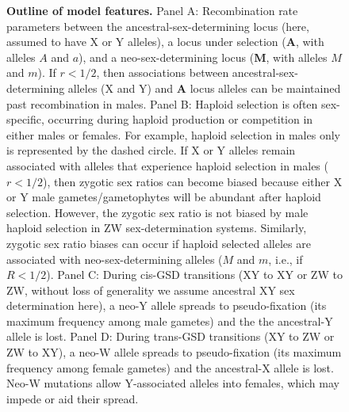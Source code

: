 \documentclass[10pt,letterpaper]{article}
\begin{document}
\begin{figure}[!h]
\caption{
{\bf Outline of model features.}
Panel A: Recombination rate parameters between the ancestral-sex-determining locus (here, assumed to have X or Y alleles), a locus under selection (\textbf{A}, with alleles $A$ and $a$), and a neo-sex-determining locus (\textbf{M}, with alleles $M$ and $m$). If $r<1/2$, then associations between ancestral-sex-determining alleles (X and Y) and \textbf{A} locus alleles can be maintained past recombination in males. 
Panel B: Haploid selection is often sex-specific, occurring during haploid production or competition in either males or females. 
For example, haploid selection in males only is represented by the dashed circle.  
If X or Y alleles remain associated with alleles that experience haploid selection in males ($r<1/2$), then zygotic sex ratios can become biased because either X or Y male gametes/gametophytes will be abundant after haploid selection. 
However, the zygotic sex ratio is not biased by male haploid selection in ZW sex-determination systems. 
Similarly, zygotic sex ratio biases can occur if haploid selected alleles are associated with neo-sex-determining alleles ($M$ and $m$, i.e., if $R<1/2$). 
Panel C: During cis-GSD transitions (XY to XY or ZW to ZW, without loss of generality we assume ancestral XY sex determination here), a neo-Y allele spreads to pseudo-fixation (its maximum frequency among male gametes) and the the ancestral-Y allele is lost. 
Panel D: During trans-GSD transitions (XY to ZW or ZW to XY), a neo-W allele spreads to pseudo-fixation (its maximum frequency among female gametes) and the ancestral-X allele is lost. Neo-W mutations allow Y-associated alleles into females, which may impede or aid their spread. 
}
\label{fig:model_outline}
\end{figure}
\end{document}
